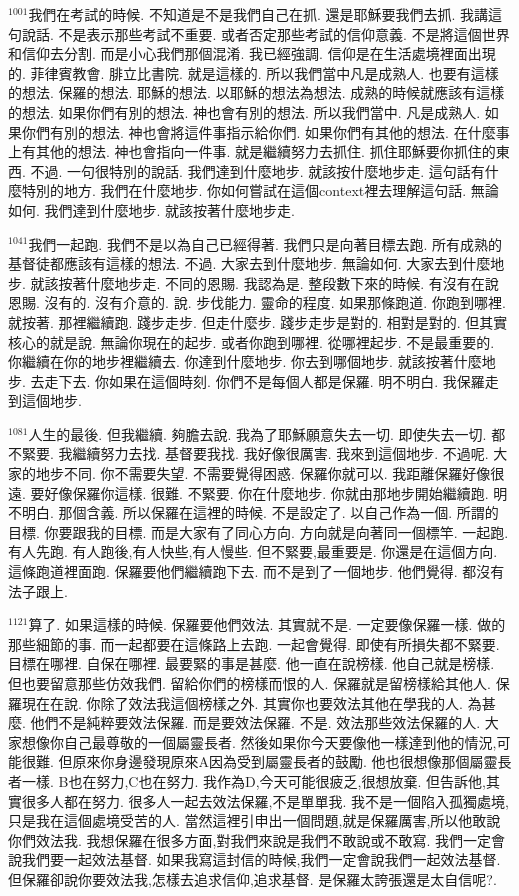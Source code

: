\documentclass{book}
\begin{document}
$^{1001}$我們在考試的時候.
不知道是不是我們自己在抓.
還是耶穌要我們去抓.
我講這句說話.
不是表示那些考試不重要.
或者否定那些考試的信仰意義.
不是將這個世界和信仰去分割.
而是小心我們那個混淆.
我已經強調.
信仰是在生活處境裡面出現的.
菲律賓教會.
腓立比書院.
就是這樣的.
所以我們當中凡是成熟人.
也要有這樣的想法.
保羅的想法.
耶穌的想法.
以耶穌的想法為想法.
成熟的時候就應該有這樣的想法.
如果你們有別的想法.
神也會有別的想法.
所以我們當中.
凡是成熟人.
如果你們有別的想法.
神也會將這件事指示給你們.
如果你們有其他的想法.
在什麼事上有其他的想法.
神也會指向一件事.
就是繼續努力去抓住.
抓住耶穌要你抓住的東西.
不過.
一句很特別的說話.
我們達到什麼地步.
就該按什麼地步走.
這句話有什麼特別的地方.
我們在什麼地步.
你如何嘗試在這個context裡去理解這句話.
無論如何.
我們達到什麼地步.
就該按著什麼地步走.

$^{1041}$我們一起跑.
我們不是以為自己已經得著.
我們只是向著目標去跑.
所有成熟的基督徒都應該有這樣的想法.
不過.
大家去到什麼地步.
無論如何.
大家去到什麼地步.
就該按著什麼地步走.
不同的恩賜.
我認為是.
整段數下來的時候.
有沒有在說恩賜.
沒有的.
沒有介意的.
說.
步伐能力.
靈命的程度.
如果那條跑道.
你跑到哪裡.
就按著.
那裡繼續跑.
踐步走步.
但走什麼步.
踐步走步是對的.
相對是對的.
但其實核心的就是說.
無論你現在的起步.
或者你跑到哪裡.
從哪裡起步.
不是最重要的.
你繼續在你的地步裡繼續去.
你達到什麼地步.
你去到哪個地步.
就該按著什麼地步.
去走下去.
你如果在這個時刻.
你們不是每個人都是保羅.
明不明白.
我保羅走到這個地步.

$^{1081}$人生的最後.
但我繼續.
夠膽去說.
我為了耶穌願意失去一切.
即使失去一切.
都不緊要.
我繼續努力去找.
基督要我找.
我好像很厲害.
我來到這個地步.
不過呢.
大家的地步不同.
你不需要失望.
不需要覺得困惑.
保羅你就可以.
我距離保羅好像很遠.
要好像保羅你這樣.
很難.
不緊要.
你在什麼地步.
你就由那地步開始繼續跑.
明不明白.
那個含義.
所以保羅在這裡的時候.
不是設定了.
以自己作為一個.
所謂的目標.
你要跟我的目標.
而是大家有了同心方向.
方向就是向著同一個標竿.
一起跑.
有人先跑.
有人跑後,有人快些,有人慢些.
但不緊要,最重要是.
你還是在這個方向.
這條跑道裡面跑.
保羅要他們繼續跑下去.
而不是到了一個地步.
他們覺得.
都沒有法子跟上.

$^{1121}$算了.
如果這樣的時候.
保羅要他們效法.
其實就不是.
一定要像保羅一樣.
做的那些細節的事.
而一起都要在這條路上去跑.
一起會覺得.
即使有所損失都不緊要.
目標在哪裡.
自保在哪裡.
最要緊的事是甚麼.
他一直在說榜樣.
他自己就是榜樣.
但也要留意那些仿效我們.
留給你們的榜樣而恨的人.
保羅就是留榜樣給其他人.
保羅現在在說.
你除了效法我這個榜樣之外.
其實你也要效法其他在學我的人.
為甚麼.
他們不是純粹要效法保羅.
而是要效法保羅.
不是.
效法那些效法保羅的人.
大家想像你自己最尊敬的一個屬靈長者.
然後如果你今天要像他一樣達到他的情況,可能很難.
但原來你身邊發現原來A因為受到屬靈長者的鼓勵.
他也很想像那個屬靈長者一樣.
B也在努力,C也在努力.
我作為D,今天可能很疲乏,很想放棄.
但告訴他,其實很多人都在努力.
很多人一起去效法保羅,不是單單我.
我不是一個陷入孤獨處境,只是我在這個處境受苦的人.
當然這裡引申出一個問題,就是保羅厲害,所以他敢說你們效法我.
我想保羅在很多方面,對我們來說是我們不敢說或不敢寫.
我們一定會說我們要一起效法基督.
如果我寫這封信的時候,我們一定會說我們一起效法基督.
但保羅卻說你要效法我,怎樣去追求信仰,追求基督.
是保羅太誇張還是太自信呢?.
\end{document}
